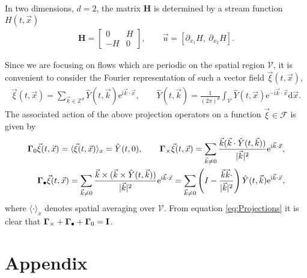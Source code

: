 \documentclass[11pt]{amsart}
\newcommand{\I}{\mathrm{i}}
\newcommand{\e}{\mathrm{e}}
\renewcommand{\d}{\mathrm{d}}
\newcommand{\Hb}{\mathbf{H}}
\newcommand{\Ib}{\mathbf{I}}
\newcommand{\Vc}{\mathcal{V}}
\newcommand{\Fs}{\mathscr{F}}
\newcommand\bGamma{\mbox{\boldmath${\Gamma}$}}
\begin{document}
In two dimensions, $d=2$, the matrix $\Hb$ is determined by a stream
function $H(t,\vec{x})$ 
%
\begin{align}\label{eq:u_H}  
  \Hb=\left[
  \begin{array}{cc}
    0  & H\\
    -H & 0
  \end{array}
  \right],
  \qquad
  \vec{u}=[\partial_{x_1}H, \ \partial_{x_2}H].
\end{align}
%


Since we are focusing on flows which are periodic on the spatial
region $\Vc$, it is convenient to consider the Fourier
representation of such a vector field $\vec{\xi}(t,\vec{x})$, 
%
\begin{align}
  \vec{\xi}(t,\vec{x})
    =\sum_{\vec{k}\in\mathbb{Z}^d}
       \hat{Y}(t,\vec{k})\e^{\I\vec{k}\cdot\vec{x}},
  \qquad
  \hat{Y}(t,\vec{k})
    =\frac{1}{(2\pi)^d}\int_{\Vc}
       \hat{Y}(t,\vec{x})\e^{-\I\vec{k}\cdot\vec{x}} \d\vec{x}.
\end{align}
%
The associated action of the above projection operators on a function
$\vec{\xi}\in\Fs$ is given by \cite{Fannjiang:SIAM_JAM:333} 
%
\begin{align}\label{eq:Projections}
  \bGamma_0\vec{\xi}(t,\vec{x})
    =\langle\vec{\xi}(t,\vec{x})\rangle_x
    =\hat{Y}(t,0),
    \qquad
  \bGamma_\times\vec{\xi}(t,\vec{x})
    =\sum_{\vec{k}\neq0}
       \frac{\vec{k}(\vec{k}\cdot\hat{Y}(t,\vec{k}))}{|\vec{k}|^2}
       \e^{\I\vec{k}\cdot\vec{x}},
    \\
  \bGamma_\bullet\vec{\xi}(t,\vec{x})
    =\sum_{\vec{k}\neq0}
       \frac{\vec{k}\times(\vec{k}\times\hat{Y}(t,\vec{k}))}{|\vec{k}|^2}
       \e^{\I\vec{k}\cdot\vec{x}}
    =\sum_{\vec{k}\neq0}\left(I-
       \frac{\vec{k}\vec{k}\cdot}{|\vec{k}|^2}\right) 
       \hat{Y}(t,\vec{k})  \e^{\I\vec{k}\cdot\vec{x}},
       \notag
\end{align}
%
where $\langle\cdot\rangle_x$ denotes spatial averaging over $\Vc$. From
equation \eqref{eq:Projections} it is clear that
$\bGamma_\times+\bGamma_\bullet+\bGamma_0=\Ib$. 


  \setcounter{equation}{1}  %
  \setcounter{section}{0}  %
  \renewcommand{\theequation}{A-\arabic{equation}} 
\renewcommand{\thesection}{A-\arabic{section}}
%
\section{Appendix} 
\label{sec:Appendix}
%
\end{document}
